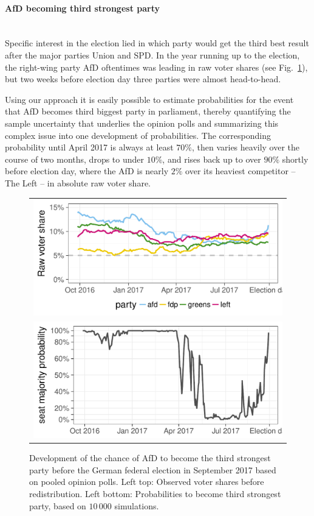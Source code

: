 \documentclass[smallcondensed]{svjour3}     %
\begin{document}
\paragraph{AfD becoming third strongest party} \ \\
Specific interest in the election lied in which party would
get the third best result after the major parties Union and SPD.
In the year running up to the election, the right-wing party
AfD oftentimes was leading in raw voter shares (see Fig.~\ref{fig:2017_afd}),
but two weeks before election day three parties were almost
head-to-head.

Using our approach it is easily possible to estimate probabilities
for the event that AfD becomes third biggest party in parliament,
thereby quantifying the sample uncertainty that underlies the
opinion polls and summarizing this complex issue into one
development of probabilities.
The corresponding probability until April 2017
is always at least $70\%$, then varies heavily over the course
of two months, drops to under $10\%$, and rises back up to
over $90\%$ shortly before election day, where the AfD is
nearly $2\%$ over its heaviest competitor -- The Left -- in
absolute raw voter share.

\begin{figure}[H]\centering
\begin{tabular}{l}
\includegraphics[height=.15\textwidth]{figures/2017_pooled_afd_rawShares.pdf}
\\
\includegraphics[height=.15\textwidth]{figures/2017_pooled_afd_thirdPartyProb.pdf}
\end{tabular}
\caption{Development of the chance of AfD to become the third strongest party before the German federal election in September 2017 based on pooled opinion polls.
Left top: Observed voter shares before redistribution. Left bottom: Probabilities to become third strongest party, based on $10\,000$ simulations.
\label{fig:2017_afd}
}
\end{figure}
\end{document}
